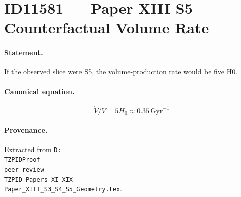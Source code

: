 \section*{ID11581 --- Paper XIII S5 Counterfactual Volume Rate}

\paragraph{Statement.}
If the observed slice were S5, the volume-production rate would be five H0.

\paragraph{Canonical equation.}
\[
\dot V/V=5H_0\approx0.35\,\mathrm{Gyr}^{-1}
\]

\paragraph{Provenance.}
Extracted from \texttt{D:\\TZPIDProof\\peer\_review\\TZPID\_Papers\_XI\_XIX\\Paper\_XIII\_S3\_S4\_S5\_Geometry.tex}.
